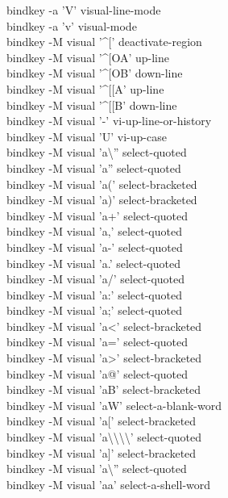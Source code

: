\documentclass[11pt,a4paper,twoside]{book}
\begin{document}
bindkey -a 'V' visual-line-mode\\
bindkey -a 'v' visual-mode\\
bindkey -M visual '\textasciicircum{}[' deactivate-region\\
bindkey -M visual '\textasciicircum{}[OA' up-line\\
bindkey -M visual '\textasciicircum{}[OB' down-line\\
bindkey -M visual '\textasciicircum{}[[A' up-line\\
bindkey -M visual '\textasciicircum{}[[B' down-line\\
bindkey -M visual '-' vi-up-line-or-history\\
bindkey -M visual 'U' vi-up-case\\
bindkey -M visual 'a\textbackslash{}'' select-quoted\\
bindkey -M visual 'a'' select-quoted\\
bindkey -M visual 'a(' select-bracketed\\
bindkey -M visual 'a)' select-bracketed\\
bindkey -M visual 'a+' select-quoted\\
bindkey -M visual 'a,' select-quoted\\
bindkey -M visual 'a-' select-quoted\\
bindkey -M visual 'a.' select-quoted\\
bindkey -M visual 'a/' select-quoted\\
bindkey -M visual 'a:' select-quoted\\
bindkey -M visual 'a;' select-quoted\\
bindkey -M visual 'a<' select-bracketed\\
bindkey -M visual 'a=' select-quoted\\
bindkey -M visual 'a>' select-bracketed\\
bindkey -M visual 'a@' select-quoted\\
bindkey -M visual 'aB' select-bracketed\\
bindkey -M visual 'aW' select-a-blank-word\\
bindkey -M visual 'a[' select-bracketed\\
bindkey -M visual 'a\textbackslash{}\textbackslash{}\textbackslash{}\textbackslash{}' select-quoted\\
bindkey -M visual 'a]' select-bracketed\\
bindkey -M visual 'a\textbackslash{}'' select-quoted\\
bindkey -M visual 'aa' select-a-shell-word\\
\end{document}
